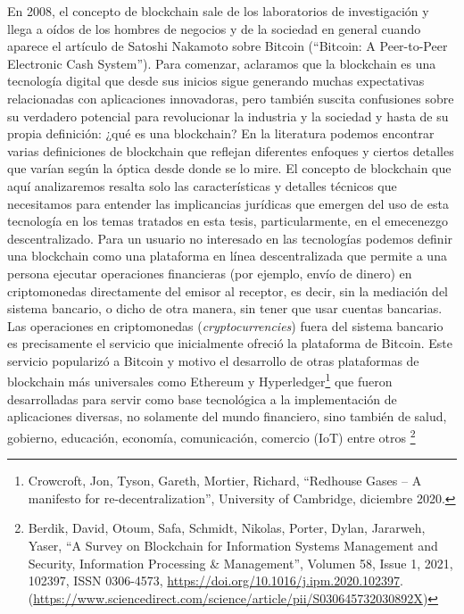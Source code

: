 \documentclass[12pt]{report} %
\begin{document}
En 2008, el concepto de blockchain sale de los laboratorios de investigación y llega a oídos de los hombres de negocios y de la sociedad en general cuando aparece el artículo de Satoshi Nakamoto sobre Bitcoin (“Bitcoin: A Peer-to-Peer Electronic Cash System”). Para comenzar, aclaramos que la blockchain es una tecnología digital que desde sus inicios sigue generando muchas expectativas relacionadas con aplicaciones innovadoras, pero también suscita confusiones sobre su verdadero potencial para revolucionar la industria y la sociedad y hasta de su propia definición: ¿qué es una blockchain? 
 En la literatura podemos encontrar varias definiciones de blockchain que reflejan diferentes enfoques y ciertos detalles que varían según la óptica desde donde se lo mire.  El concepto de blockchain que aquí analizaremos resalta solo las características y detalles técnicos que necesitamos para entender las implicancias jurídicas que emergen del uso de esta tecnología en los temas tratados en esta tesis, particularmente, en el emecenezgo descentralizado. 
Para un usuario no interesado en las tecnologías podemos definir una blockchain como una plataforma en línea descentralizada que permite a una persona ejecutar operaciones financieras (por ejemplo, envío de dinero) en criptomonedas directamente del emisor al receptor, es decir, sin la mediación del sistema bancario, o dicho de otra manera, sin tener que usar cuentas bancarias. Las operaciones en criptomonedas (\textit{cryptocurrencies}) fuera del sistema bancario es precisamente el servicio que inicialmente ofreció la plataforma de Bitcoin. Este servicio popularizó a Bitcoin y motivo el desarrollo de otras plataformas de blockchain más universales como Ethereum y 
Hyperledger\footnote{Crowcroft, Jon, Tyson, Gareth, Mortier, Richard, “Redhouse Gases -- A manifesto for re-decentralization”,  University of Cambridge, diciembre 2020.} que fueron desarrolladas para servir como base tecnológica a la implementación de aplicaciones diversas, no solamente del mundo financiero, sino también de salud, gobierno, educación, economía, comunicación, comercio (IoT) entre otros 
\footnote{Berdik, David, Otoum, Safa, Schmidt, Nikolas, Porter, Dylan, Jararweh, Yaser, “A Survey on Blockchain for Information Systems Management and Security, Information Processing \& Management”, Volumen 58, Issue 1, 2021, 102397, ISSN 0306-4573, \url{https://doi.org/10.1016/j.ipm.2020.102397}. (\url{https://www.sciencedirect.com/science/article/pii/S030645732030892X})}
\end{document}
